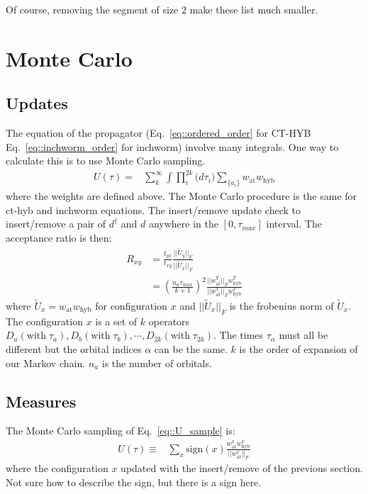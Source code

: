 \documentclass[10pt,letter]{article}
\begin{document}
Of course, removing the segment of size $2$ make these list much smaller. 




\section{Monte Carlo}

\subsection{Updates}
The equation of the propagator (Eq.~\eqref{eq::ordered_order} for CT-HYB Eq.~\eqref{eq::inchworm_order} for inchworm) involve many integrals. One way to calculate this is to use Monte Carlo sampling. 
\begin{align}
U(\tau)=& 
\sum_k^{\infty} \int \prod_i^{2k} \Big( d \tau_{i} \Big)  \sum_{\{a_i\}} 
w_{\mathrm{at}} w_{\mathrm{hyb}}
\label{eq::U_sample}
\end{align}
%
%
where the weights are defined above. The Monte Carlo procedure is the same for ct-hyb and inchworm equations. The insert/remove update check to insert/remove a pair of $d^\dagger$ and $d$ anywhere in the $[0,\tau_{max}]$ interval. The acceptance ratio is then:
\begin{align}
R_{xy}&=\frac{t_{yx}}
             {t_{xy}}
        \frac{\vert\vert \tilde U_y \vert\vert_F}
             {\vert\vert \tilde U_x \vert\vert_F}\\
      &=\left(\frac{n_a \tau_{max} }{k+1} \right)^2
        \frac{\vert\vert w^y_{\mathrm{at}} \vert\vert_F w^y_{\mathrm{hyb}}}
             {\vert\vert w^x_{\mathrm{at}} \vert\vert_F w^x_{\mathrm{hyb}}}
\end{align}
where $\tilde U_x = w_{\mathrm{at}} w_{\mathrm{hyb}}$ for configuration $x$ and $\vert\vert \tilde U_x \vert\vert_F$ is the frobenius norm of $\tilde U_x$. The configuration $x$ is a set of $k$ operators $D_a (\text{with} \; \tau_a), D_b (\text{with} \; \tau_b), \cdots, D_{2k} (\text{with} \; \tau_{2k})$. The times $\tau_\alpha$ must all be different but the orbital indices $\alpha$ can be the same. $k$ is the order of expansion of our Markov chain. $n_a$ is the number of orbitals.

\subsection{Measures}
The Monte Carlo sampling of Eq.~\eqref{eq::U_sample} is:
\begin{align}
U(\tau)
\equiv& 
\sum_x \text{sign}(x)
\frac{w^x_{\mathrm{at}} w^x_{\mathrm{hyb}}}
{\vert\vert w^x_{\mathrm{at}} \vert\vert_F}
\end{align}
where the configuration $x$ updated with the insert/remove of the previous section. Not sure how to describe the sign, but there is a sign here.
\end{document}
